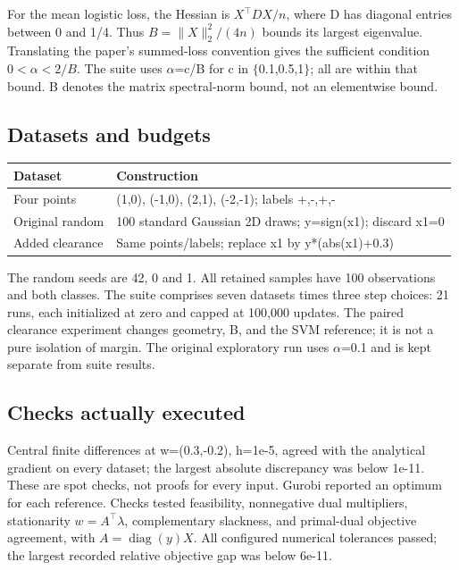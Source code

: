 \documentclass[12pt,a4paper]{article}
\begin{document}
For the mean logistic loss, the Hessian is $X^\top D X/n$, where D has diagonal entries between 0 and 1/4. Thus $B=\|X\|_2^2/(4n)$ bounds its largest eigenvalue. Translating the paper's summed-loss convention gives the sufficient condition $0<\alpha<2/B$. The suite uses $\alpha$=c/B for c in $\{$0.1,0.5,1$\}$; all are within that bound. B denotes the matrix spectral-norm bound, not an elementwise bound.

\subsection{Datasets and budgets}
\begin{center}
\small
\begin{tabular}{@{}p{}p{}@{}}
\toprule
\textbf{Dataset} & \textbf{Construction} \\
\midrule
Four points & (1,0), (-1,0), (2,1), (-2,-1); labels +,-,+,- \\
Original random & 100 standard Gaussian 2D draws; y=sign(x1); discard x1=0 \\
Added clearance & Same points/labels; replace x1 by y*(abs(x1)+0.3) \\
\bottomrule
\end{tabular}
\end{center}
The random seeds are 42, 0 and 1. All retained samples have 100 observations and both classes. The suite comprises seven datasets times three step choices: 21 runs, each initialized at zero and capped at 100,000 updates. The paired clearance experiment changes geometry, B, and the SVM reference; it is not a pure isolation of margin. The original exploratory run uses $\alpha$=0.1 and is kept separate from suite results.

\subsection{Checks actually executed}
Central finite differences at w=(0.3,-0.2), h=1e-5, agreed with the analytical gradient on every dataset; the largest absolute discrepancy was below 1e-11. These are spot checks, not proofs for every input. Gurobi reported an optimum for each reference. Checks tested feasibility, nonnegative dual multipliers, stationarity $w=A^\top\lambda$, complementary slackness, and primal-dual objective agreement, with $A=\operatorname{diag}(y)X$. All configured numerical tolerances passed; the largest recorded relative objective gap was below 6e-11.
\end{document}
